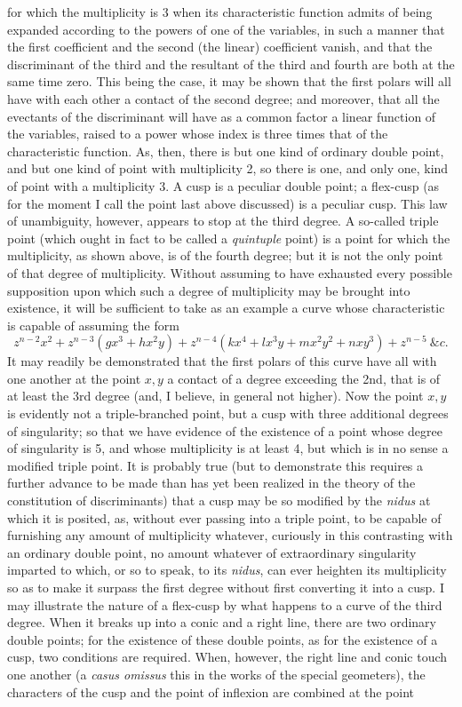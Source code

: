 \documentclass[11pt]{article}
\newcommand{\sourcepage}[1]{\marginpar{\scriptsize p.~#1}}
\begin{document}
\sourcepage{373}
for which the multiplicity is 3 when its characteristic function admits of being expanded according to the powers of one of the variables, in such a manner that the first coefficient and the second (the linear) coefficient vanish, and that the discriminant of the third and the resultant of the third and fourth are both at the same time zero. This being the case, it may be shown that the first polars will all have with each other a contact of the second degree; and moreover, that all the evectants of the discriminant will have as a common factor a linear function of the variables, raised to a power whose index is three times that of the characteristic function. As, then, there is but one kind of ordinary double point, and but one kind of point with multiplicity 2, so there is one, and only one, kind of point with a multiplicity 3. A cusp is a peculiar double point; a flex-cusp (as for the moment I call the point last above discussed) is a peculiar cusp. This law of unambiguity, however, appears to stop at the third degree. A so-called triple point (which ought in fact to be called a \emph{quintuple} point) is a point for which the multiplicity, as shown above, is of the fourth degree; but it is not the only point of that degree of multiplicity. Without assuming to have exhausted every possible supposition upon which such a degree of multiplicity may be brought into existence, it will be sufficient to take as an example a curve whose characteristic is capable of assuming the form
\[
z^{n-2}x^2+z^{n-3}(gx^3+hx^2y)+z^{n-4}(kx^4+lx^3y+mx^2y^2+nxy^3)+z^{n-5}\ \&c.
\]
It may readily be demonstrated that the first polars of this curve have all with one another at the point $x,y$ a contact of a degree exceeding the 2nd, that is of at least the 3rd degree (and, I believe, in general not higher). Now the point $x,y$ is evidently not a triple-branched point, but a cusp with three additional degrees of singularity; so that we have evidence of the existence of a point whose degree of singularity is 5, and whose multiplicity is at least 4, but which is in no sense a modified triple point. It is probably true (but to demonstrate this requires a further advance to be made than has yet been realized in the theory of the constitution of discriminants) that a cusp may be so modified by the \emph{nidus} at which it is posited, as, without ever passing into a triple point, to be capable of furnishing any amount of multiplicity whatever, curiously in this contrasting with an ordinary double point, no amount whatever of extraordinary singularity imparted to which, or so to speak, to its \emph{nidus}, can ever heighten its multiplicity so as to make it surpass the first degree without first converting it into a cusp. I may illustrate the nature of a flex-cusp by what happens to a curve of the third degree. When it breaks up into a conic and a right line, there are two ordinary double points; for the existence of these double points, as for the existence of a cusp, two conditions are required. When, however, the right line and conic touch one another (a \emph{casus omissus} this in the works of the special geometers), the characters of the cusp and the point of inflexion are combined at the point
\end{document}
